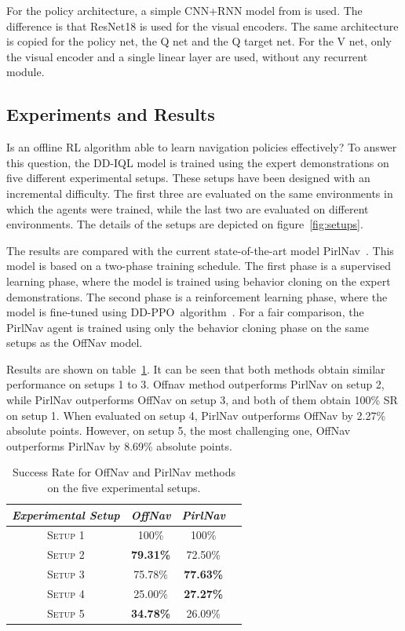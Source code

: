 For the policy architecture, a simple CNN+RNN model from\cite{ramrakhya2023} is used.
The difference is that ResNet18 is used for the visual encoders.
The same architecture is copied for the policy net, the Q net and the Q target net.
For the V net, only the visual encoder and a single linear layer are used, without any recurrent module.

\subsection{Experiments and Results}\label{subsec:experiments_offnav}

Is an offline RL algorithm able to learn navigation policies effectively?
To answer this question, the DD-IQL model is trained using the expert demonstrations on five different experimental setups.
These setups have been designed with an incremental difficulty.
The first three are evaluated on the same environments in which the agents were trained, while the last two are evaluated on different environments.
The details of the setups are depicted on figure~\ref{fig:setups}.

The results are compared with the current state-of-the-art model PirlNav~\cite{ramrakhya2023}.
This model is based on a two-phase training schedule.
The first phase is a supervised learning phase, where the model is trained using behavior cloning on the expert demonstrations.
The second phase is a reinforcement learning phase, where the model is fine-tuned using DD-PPO~algorithm~\cite{wijmans2020}.
For a fair comparison, the PirlNav agent is trained using only the behavior cloning phase on the same setups as the OffNav model.

Results are shown on table~\ref{tab:success}.
It can be seen that both methods obtain similar performance on setups 1 to 3.
Offnav method outperforms PirlNav on setup 2, while PirlNav outperforms OffNav on setup 3, and both of them obtain 100\% SR on setup 1.
When evaluated on setup 4, PirlNav outperforms OffNav by 2.27\% absolute points.
However, on setup 5, the most challenging one, OffNav outperforms PirlNav by 8.69\% absolute points.

\begin{table}
    \centering
    \begin{tabular}{c|ccc}
        \toprule
        \textit{Experimental Setup} & \textit{OffNav}  & \textit{PirlNav} \\
        \midrule
        \textsc{Setup 1}            & 100\%            & 100\%            \\
        \textsc{Setup 2}            & \textbf{79.31\%} & 72.50\%          \\
        \textsc{Setup 3}            & 75.78\%          & \textbf{77.63\%} \\
        \textsc{Setup 4}            & 25.00\%          & \textbf{27.27\%} \\
        \textsc{Setup 5}            & \textbf{34.78\%} & 26.09\%          \\
        \bottomrule
    \end{tabular}
    \caption{Success Rate for OffNav and PirlNav methods on the five experimental setups.}
    \label{tab:success}
\end{table}

